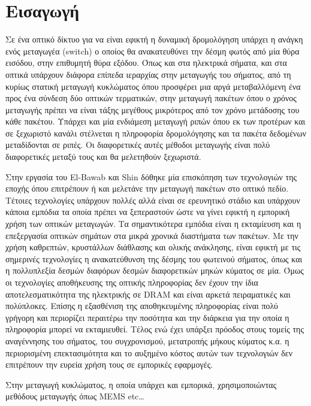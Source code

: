 ﻿\section{Εισαγωγή}

Σε ένα οπτικό δίκτυο για να είναι εφικτή η δυναμική δρομολόγηση
υπάρχει η ανάγκη ενός μεταγωγέα (switch) ο οποίος θα ανακατευθύνει την
δέσμη φωτός από μία θύρα εισόδου, στην επιθυμητή θύρα εξόδου. Όπως και
στα ηλεκτρικά σήματα, και στα οπτικά υπάρχουν διάφορα επίπεδα
ιεραρχίας στην μεταγωγής του σήματος, από τη κυρίως στατική μεταγωγή
κυκλώματος όπου προσφέρει μια αργά μεταβαλλόμενη ένα προς ένα σύνδεση
δύο οπτικών τερματικών, στην μεταγωγή πακέτων όπου ο χρόνος μεταγωγής
πρέπει να είναι τάξης μεγέθους μικρότερος από τον χρόνο μετάδοσης του
κάθε πακέτου. Υπάρχει και μία ενδιάμεση μεταγωγή ριπών όπου εκ των
προτέρων και σε ξεχωριστό κανάλι στέλνεται η πληροφορία δρομολόγησης
και τα πακέτα δεδομένων μεταδίδονται σε ριπές. Οι διαφορετικές αυτές
μέθοδοι μεταγωγής είναι πολύ διαφορετικές μεταξύ τους και θα
μελετηθούν ξεχωριστά.


Στην εργασία του El-Bawab και Shin \cite{} δόθηκε μία επισκόπηση των
τεχνολογιών της εποχής όπου επιτρέπουν ή και μελετάνε την μεταγωγή
πακέτων στο οπτικό πεδίο. Τέτοιες τεχνολογίες υπάρχουν πολλές αλλά
είναι σε ερευνητικό στάδιο και υπάρχουν κάποια εμπόδια τα οποία πρέπει
να ξεπεραστούν ώστε να γίνει εφικτή η εμπορική χρήση των οπτικών
μεταγωγών. Τα σημαντικότερα εμπόδια είναι η εκταμίευση και η
επεξεργασία οπτικών σημάτων στα μικρά χρονικά διαστήματα των
πακέτων. Με την χρήση καθρεπτών, κρυστάλλων διάθλασης και ολικής
ανάκλησης, είναι εφικτή με τις σημερινές τεχνολογίες η ανακατεύθυνση
της δέσμης του φωτεινού σήματος, όπως και η πολλυπλεξία δεσμών
διαφόρων δεσμών διαφορετικών μηκών κύματος σε μία. Όμως οι τεχνολογίες
αποθήκευσης της οπτικής πληροφορίας δεν έχουν την ίδια
αποτελεσματικότητα της ηλεκτρικής σε DRAM και είναι αρκετά
πειραματικές και πολύπλοκες. Επίσης η εξασθένιση της αποθηκευμένης
πληροφορίας είναι πολύ γρήγορη και περιορίζει περαιτέρω την ποσότητα
και την διάρκεια για την οποία η πληροφορία μπορεί να
εκταμιευθεί. Τέλος ενώ έχει υπάρξει πρόοδος στους τομείς της
αναγέννησης του σήματος, του συγχρονισμού, μετατροπής μήκους κύματος
κ.α. η περιορισμένη επεκτασιμότητα και το αυξημένο κόστος αυτών των
τεχνολογιών δεν επιτρέπουν την ευρεία χρήση τους σε εμπορικές
εφαρμογές.



Στην μεταγωγή κυκλώματος, η οποία υπάρχει και εμπορικά,
χρησιμοποιώντας μεθόδους μεταγωγής όπως MEMS etc\ldots


